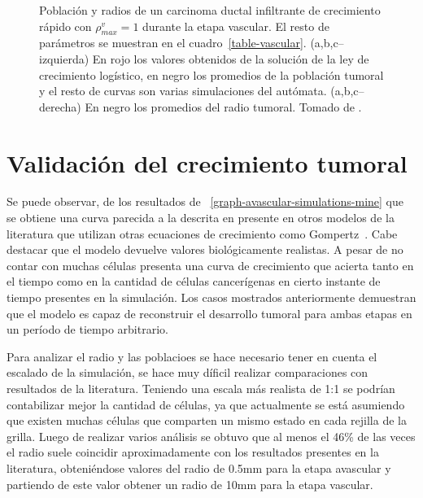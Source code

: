 \begin{figure}[p]
\begin{center}
\end{center}\vspace*{-0.6cm}
\caption[Poblaci\'on y radios de un carcinoma ductal infiltrante de crecimiento r\'apido con $\rho_{max}^v=1$ durante la etapa vascular]{Poblaci\'on y radios de un carcinoma ductal infiltrante de crecimiento r\'apido con $\rho_{max}^v=1$ durante la etapa vascular. El resto de par\'ametros se muestran en el cuadro~\ref{table-vascular}. (a,b,c--izquierda) En rojo los valores obtenidos de la soluci\'on de la ley de crecimiento log\'istico, en negro los promedios de la poblaci\'on tumoral y el resto de curvas son varias simulaciones del aut\'omata. (a,b,c--derecha) En negro los promedios del radio tumoral. Tomado de \cite{viabarre2019}.}
\label{graph-vascular-simulations}
\end{figure}

\section{Validaci\'on del crecimiento tumoral}
\label{sec-growth-validation}

Se puede observar, de los resultados de ~\ref{graph-avascular-simulations-mine} que se obtiene una curva parecida a la descrita en \cite{book} presente en otros modelos de la literatura que utilizan otras ecuaciones de crecimiento como Gompertz~\cite{kansal,dormann,kansal2,kansal3}. Cabe destacar que el modelo devuelve valores biol\'ogicamente realistas. A pesar de no contar con muchas c\'elulas presenta una curva de crecimiento que acierta tanto en el tiempo como en la cantidad de c\'elulas cancer\'igenas en cierto instante de tiempo presentes en la simulaci\'on. Los casos mostrados anteriormente demuestran que el modelo es capaz de reconstruir el desarrollo tumoral para ambas etapas en un per\'iodo de tiempo arbitrario.

Para analizar el radio y las poblacioes se hace necesario tener en cuenta el escalado de la simulación, se hace muy d\'ificil realizar comparaciones con resultados de la literatura. Teniendo una escala m\'as realista de 1:1 se podr\'ian contabilizar mejor la cantidad de c\'elulas, ya que actualmente se est\'a asumiendo que existen muchas c\'elulas que comparten un mismo estado en cada rejilla de la grilla. Luego de realizar varios an\'alisis se obtuvo que al menos el 46\% de las veces el radio suele coincidir aproximadamente con los resultados presentes en la literatura, obteni\'endose valores del radio de 0.5mm para la etapa avascular y partiendo de este valor
obtener un radio de 10mm para la etapa vascular.

